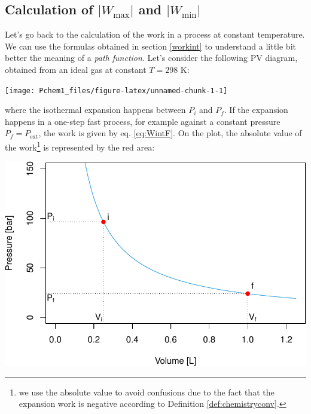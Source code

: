 \documentclass[
]{book}
\theoremstyle{definition}
\theoremstyle{definition}
\theoremstyle{definition}
\theoremstyle{remark}
\begin{document}
\hypertarget{calculation-of-w_textmax-and-w_textmin}{%
\subsection{\texorpdfstring{Calculation of \(| W_{\text{max}} |\) and \(| W_{\text{min}} |\)}{Calculation of \textbar{} W\_\{\textbackslash text\{max\}\} \textbar{} and \textbar{} W\_\{\textbackslash text\{min\}\} \textbar{}}}\label{calculation-of-w_textmax-and-w_textmin}}

Let's go back to the calculation of the work in a process at constant temperature. We can use the formulas obtained in section \ref{workint} to understand a little bit better the meaning of a \emph{path function}. Let's consider the following PV diagram, obtained from an ideal gas at constant \(T=298\) K:

\begin{center}\texttt{[image: Pchem1\_files/figure-latex/unnamed-chunk-1-1]} \end{center}

where the isothermal expansion happens between \(P_i\) and \(P_f\). If the expansion happens in a one-step fast process, for example against a constant pressure \(P_f=P_{\text{ext}}\), the work is given by eq. \eqref{eq:WintF}. On the plot, the absolute value of the work\footnote{we use the absolute value to avoid confusions due to the fact that the expansion work is negative according to Definition \ref{def:chemistryconv}.} is represented by the red area:

\begin{center}\includegraphics{Pchem1_files/figure-latex/unnamed-chunk-2-1} \end{center}
\end{document}
